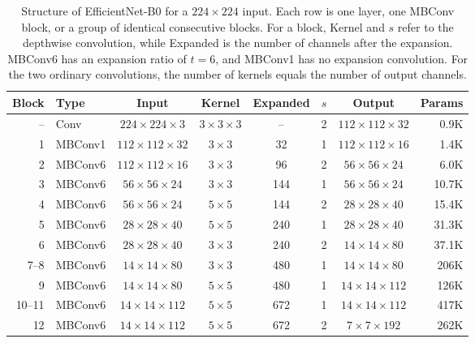 \begin{table}[!htb]
\centering
\setlength{\tabcolsep}{4pt}
\caption{Structure of EfficientNet-B0 for a $224\times224$ input. Each row is one layer, one MBConv block, or a group of identical consecutive blocks. For a block, Kernel and $s$ refer to the depthwise convolution, while Expanded is the number of channels after the expansion. MBConv6 has an expansion ratio of $t=6$, and MBConv1 has no expansion convolution. For the two ordinary convolutions, the number of kernels equals the number of output channels.}
\label{tab:efficientnet_layers}
\begin{tabular}{rlcccccr}
\toprule
\textbf{Block} & \textbf{Type} & \textbf{Input} & \textbf{Kernel} & \textbf{Expanded} & $s$ & \textbf{Output} & \textbf{Params} \\
\midrule
--      & Conv            & $224\times224\times3$  & $3\times3\times3$   & --   & 2  & $112\times112\times32$ & 0.9K  \\
1       & MBConv1         & $112\times112\times32$ & $3\times3$          & 32   & 1  & $112\times112\times16$ & 1.4K  \\
2       & MBConv6         & $112\times112\times16$ & $3\times3$          & 96   & 2  & $56\times56\times24$   & 6.0K  \\
3       & MBConv6         & $56\times56\times24$   & $3\times3$          & 144  & 1  & $56\times56\times24$   & 10.7K \\
4       & MBConv6         & $56\times56\times24$   & $5\times5$          & 144  & 2  & $28\times28\times40$   & 15.4K \\
5       & MBConv6         & $28\times28\times40$   & $5\times5$          & 240  & 1  & $28\times28\times40$   & 31.3K \\
6       & MBConv6         & $28\times28\times40$   & $3\times3$          & 240  & 2  & $14\times14\times80$   & 37.1K \\
7--8    & MBConv6         & $14\times14\times80$   & $3\times3$          & 480  & 1  & $14\times14\times80$   & 206K  \\
9       & MBConv6         & $14\times14\times80$   & $5\times5$          & 480  & 1  & $14\times14\times112$  & 126K  \\
10--11  & MBConv6         & $14\times14\times112$  & $5\times5$          & 672  & 1  & $14\times14\times112$  & 417K  \\
12      & MBConv6         & $14\times14\times112$  & $5\times5$          & 672  & 2  & $7\times7\times192$    & 262K  \\

\end{tabular}
\end{table}
